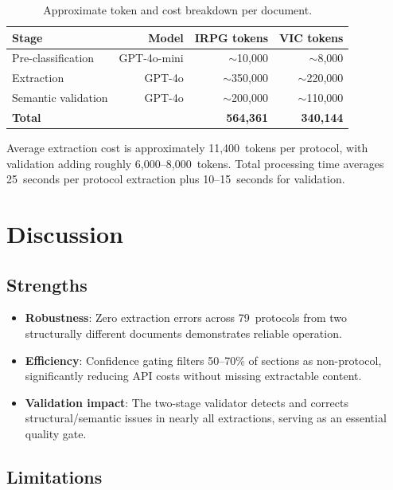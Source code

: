 \documentclass[12pt,a4paper]{article}
\begin{document}
\begin{table}[H]
\centering
\caption{Approximate token and cost breakdown per document.}
\label{tab:cost}
\begin{tabular}{l r r r}
\toprule
\textbf{Stage} & \textbf{Model} & \textbf{IRPG tokens} & \textbf{VIC tokens} \\
\midrule
Pre-classification     & GPT-4o-mini & $\sim$10,000   & $\sim$8,000 \\
Extraction             & GPT-4o      & $\sim$350,000  & $\sim$220,000 \\
Semantic validation    & GPT-4o      & $\sim$200,000  & $\sim$110,000 \\
\midrule
\textbf{Total}         &             & \textbf{564,361} & \textbf{340,144} \\
\bottomrule
\end{tabular}
\end{table}

Average extraction cost is approximately 11,400~tokens per protocol, with validation adding roughly 6,000--8,000~tokens. Total processing time averages 25~seconds per protocol extraction plus 10--15~seconds for validation.

\section{Discussion}
\label{sec:discussion}

\subsection{Strengths}

\begin{itemize}[leftmargin=2em]
    \item \textbf{Robustness}: Zero extraction errors across 79~protocols from two structurally different documents demonstrates reliable operation.
    \item \textbf{Efficiency}: Confidence gating filters 50--70\% of sections as non-protocol, significantly reducing API costs without missing extractable content.
    \item \textbf{Validation impact}: The two-stage validator detects and corrects structural/semantic issues in nearly all extractions, serving as an essential quality gate.
\end{itemize}

\subsection{Limitations}
\end{document}
